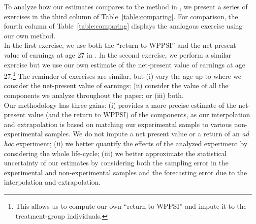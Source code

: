 \noindent To analyze how our estimates compares to the method in \citet{Kline-Walters_2016_QJE}, we present a series of exercises in the third column of Table~\ref{table:comparing}. For comparison, the fourth column of Table~\ref{table:comparing} displays the analogous exercise using our own method.\\

\noindent In the first exercise, we use both the ``return to WPPSI'' and the net-present value of earnings at age 27 in  \citet{Chetty_Friedman_etal_2011_QJoE}. In the second exercise, we perform a similar exercise but we use our own estimate of the net-present value of earnings at age 27.\footnote{This allows us to compute our own ``return to WPPSI'' and impute it to the treatment-group individuals.} The reminder of exercises are similar, but (i) vary the age up to where we consider the net-present value of earnings; (ii) consider the value of all the components we analyze throughout the paper; or (iii) both.\\

\noindent Our methodology has three gains: (i) provides a more precise estimate of the net-present value (and the return to WPPSI) of the components, as our interpolation and extrapolation is based on matching our experimental sample to various non-experimental samples. We do not impute a net present value or a return of an \textit{ad hoc} experiment; (ii) we better quantify the effects of the analyzed experiment by considering the whole life-cycle; (iii) we better approximate the statistical uncertainty of our estimates by considering both the sampling error in the experimental and non-experimental samples and the forecasting error due to the interpolation and extrapolation.

\singlespace


